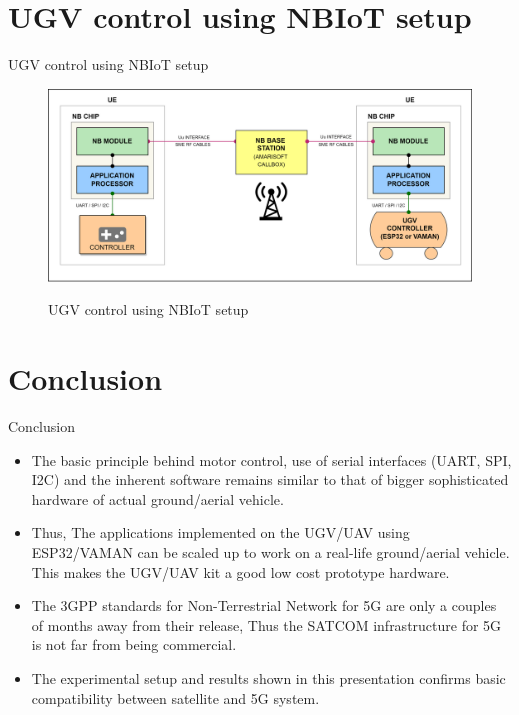 \documentclass[xcolor=table]{beamer}
\begin{document}
\section{UGV control using NBIoT setup}
\begin{frame}{UGV control using NBIoT setup}
\begin{figure}[h!]
  		\centering
  		\includegraphics[width=\linewidth]{./figs/NBIoT_setup.png}
  		\label{NBIoT_setup}
  		\caption{UGV control using NBIoT setup}
\end{figure}

\end{frame}

\section{Conclusion}
\begin{frame}{Conclusion}
\begin{itemize}
 \item The basic principle behind motor control, use of serial interfaces (UART, SPI, I2C) and the inherent software remains similar to that of bigger sophisticated hardware of actual ground/aerial vehicle.
	\item Thus, The applications implemented on the UGV/UAV using ESP32/VAMAN can be scaled up to work on a real-life ground/aerial vehicle. This makes the UGV/UAV kit a good low cost prototype hardware.
	\item The 3GPP standards for Non-Terrestrial Network for 5G are only a couples of months away from their release, Thus the SATCOM infrastructure for 5G is not far from being commercial. 
	\item The experimental setup and results shown in this presentation confirms basic compatibility between satellite and 5G system.
	
\end{itemize}

\end{frame}
\end{document}
